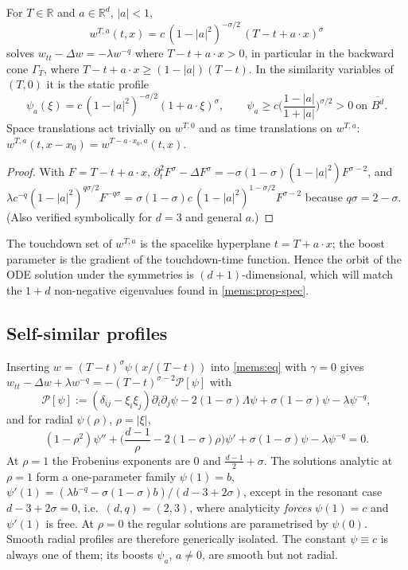 \begin{lemma}\label{mems:lem-sym}
For $T\in\mathbb R$ and $a\in\mathbb R^d$, $|a|<1$,
\begin{equation}\label{mems:boost}
  w^{T,a}(t,x)=c\,(1-|a|^2)^{-\sigma/2}\,(T-t+a\cdot x)^{\sigma}
\end{equation}
solves $w_{tt}-\Delta w=-\lambda w^{-q}$ where $T-t+a\cdot x>0$, in particular in
the backward cone $\Gamma_T$, where $T-t+a\cdot x\ge(1-|a|)(T-t)$. In the
similarity variables of $(T,0)$ it is the static profile
\begin{equation}\label{mems:psia}
  \psi_a(\xi)=c\,(1-|a|^2)^{-\sigma/2}(1+a\cdot\xi)^{\sigma},\qquad
  \psi_a\ge c\Big(\frac{1-|a|}{1+|a|}\Big)^{\sigma/2}>0\ \text{on }\overline{B^d}.
\end{equation}
Space translations act trivially on $w^{T,0}$ and as time translations on
$w^{T,a}$: $w^{T,a}(t,x-x_0)=w^{T-a\cdot x_0,a}(t,x)$.
\end{lemma}

\begin{proof}
With $F=T-t+a\cdot x$, $\partial_t^2F^\sigma-\Delta F^\sigma=-\sigma(1-\sigma)(1-|a|^2)F^{\sigma-2}$,
and $\lambda c^{-q}(1-|a|^2)^{q\sigma/2}F^{-q\sigma}=\sigma(1-\sigma)c\,(1-|a|^2)^{1-\sigma/2}F^{\sigma-2}$
because $q\sigma=2-\sigma$. (Also verified symbolically for $d=3$ and general $a$.)
\end{proof}

The touchdown set of $w^{T,a}$ is the spacelike hyperplane $t=T+a\cdot x$; the
boost parameter is the gradient of the touchdown-time function. Hence the
orbit of the ODE solution under the symmetries is $(d+1)$-dimensional, which
will match the $1+d$ non-negative eigenvalues found in \cref{mems:prop-spec}.

\subsection{Self-similar profiles}
\label{mems:sec-prof}
Inserting $w=(T-t)^{\sigma}\psi(x/(T-t))$ into \eqref{mems:eq} with $\gamma=0$
gives $w_{tt}-\Delta w+\lambda w^{-q}=-(T-t)^{\sigma-2}\mathcal P[\psi]$ with
\begin{equation}\label{mems:profile}
  \mathcal P[\psi]:=(\delta_{ij}-\xi_i\xi_j)\partial_i\partial_j\psi-2(1-\sigma)\Lambda\psi+\sigma(1-\sigma)\psi-\lambda\psi^{-q},
\end{equation}
and for radial $\psi(\rho)$, $\rho=|\xi|$,
\begin{equation}\label{mems:profile-rad}
  (1-\rho^2)\psi''+\Big(\frac{d-1}{\rho}-2(1-\sigma)\rho\Big)\psi'+\sigma(1-\sigma)\psi-\lambda\psi^{-q}=0 .
\end{equation}
At $\rho=1$ the Frobenius exponents are $0$ and $\frac{d-1}2+\sigma$. The
solutions analytic at $\rho=1$ form a one-parameter family $\psi(1)=b$,
$\psi'(1)=(\lambda b^{-q}-\sigma(1-\sigma)b)/(d-3+2\sigma)$, except in the
resonant case $d-3+2\sigma=0$, i.e.\ $(d,q)=(2,3)$, where analyticity
\emph{forces} $\psi(1)=c$ and $\psi'(1)$ is free. At $\rho=0$ the regular
solutions are parametrised by $\psi(0)$. Smooth radial profiles are therefore
generically isolated. The constant $\psi\equiv c$ is always one of them; its
boosts $\psi_a$, $a\ne0$, are smooth but not radial.

